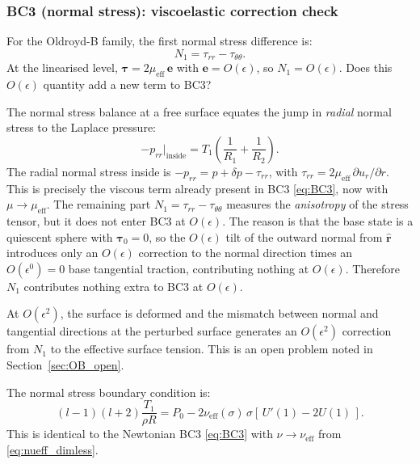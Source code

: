 \subsubsection{BC3 (normal stress): viscoelastic correction check}

\begin{derivbox}
For the Oldroyd-B family, the first normal stress difference is:
\[
  N_1 = \tau_{rr} - \tau_{\theta\theta}.
\]
At the linearised level, $\boldsymbol{\tau} = 2\mu_{\mathrm{eff}}\,\mathbf{e}$
with $\mathbf{e} = O(\epsilon)$, so $N_1 = O(\epsilon)$. Does this $O(\epsilon)$
quantity add a new term to BC3?

The normal stress balance at a free surface equates the jump in
\emph{radial} normal stress to the Laplace pressure:
\[
  -p_{rr}\big|_{\text{inside}} = T_1\!\left(\frac{1}{R_1}+\frac{1}{R_2}\right).
\]
The radial normal stress inside is $-p_{rr} = p + \delta p - \tau_{rr}$,
with $\tau_{rr} = 2\mu_{\mathrm{eff}}\,\partial u_r/\partial r$. This is
precisely the viscous term already present in BC3 \eqref{eq:BC3}, now with
$\mu \to \mu_{\mathrm{eff}}$. The remaining part $N_1 = \tau_{rr} -
\tau_{\theta\theta}$ measures the \emph{anisotropy} of the stress tensor,
but it does not enter BC3 at $O(\epsilon)$.
The reason is that the base state is a quiescent sphere with
$\boldsymbol{\tau}_0 = 0$, so the $O(\epsilon)$ tilt of the outward normal
from $\hat{\mathbf{r}}$ introduces only an $O(\epsilon)$ correction to the
normal direction times an $O(\epsilon^0) = 0$ base tangential traction,
contributing nothing at $O(\epsilon)$.
Therefore $N_1$ contributes nothing extra to BC3 at $O(\epsilon)$.

At $O(\epsilon^2)$, the surface is deformed and the mismatch between normal
and tangential directions at the perturbed surface generates an
$O(\epsilon^2)$ correction from $N_1$ to the effective surface tension.
This is an open problem noted in Section~\ref{sec:OB_open}.
\end{derivbox}

The normal stress boundary condition is:
\begin{equation}
  (l-1)(l+2)\frac{T_1}{\rho R}
  = P_0 - 2\nu_{\mathrm{eff}}(\sigma)\,\sigma\!\left[\,U'(1) - 2U(1)\,\right].
  \tag{BC3$'$}
  \label{eq:BC3_OB}
\end{equation}
This is identical to the Newtonian BC3 \eqref{eq:BC3} with
$\nu \to \nu_{\mathrm{eff}}$ from \eqref{eq:nueff_dimless}.

